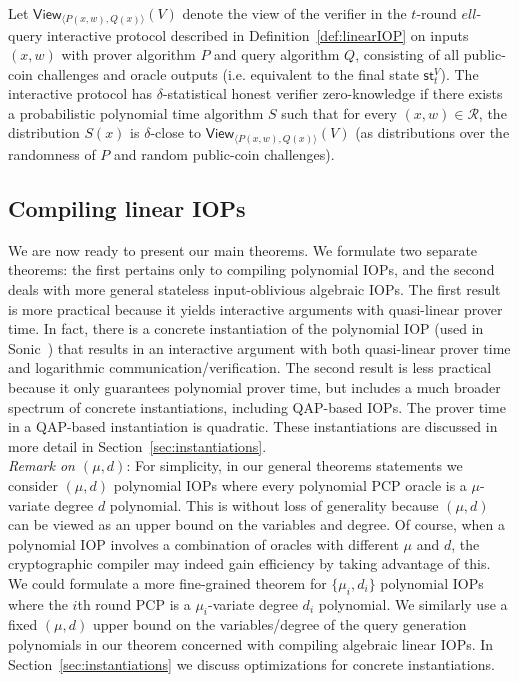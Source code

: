 \begin{definition}
Let $\textsf{View}_{\langle P(x, w), Q(x) \rangle}(V)$ denote the view of the verifier in the $t$-round $ell$-query interactive protocol described in Definition~\ref{def:linearIOP} on inputs $(x,w)$ with prover algorithm $P$ and query algorithm $Q$, consisting of all public-coin challenges and oracle outputs (i.e. equivalent to the final state $\textsf{st}^V_t$). The interactive protocol has $\delta$-statistical honest verifier zero-knowledge if there exists a probabilistic polynomial time algorithm $S$ such that for every $(x, w) \in \mathcal{R}$, the distribution $S(x)$ is $\delta$-close to $\textsf{View}_{\langle P(x, w), Q(x) \rangle}(V)$ (as distributions over the randomness of $P$ and random public-coin challenges).
\end{definition}

\subsection{Compiling linear IOPs} 
We are now ready to present our main theorems. We formulate two separate theorems: the first pertains only to compiling polynomial IOPs, and the second deals with more general stateless input-oblivious algebraic IOPs. The first result is more practical because it yields interactive arguments with quasi-linear prover time. In fact, there is a concrete instantiation of the polynomial IOP (used in Sonic~\cite{Sonic}) that results in an interactive argument with both quasi-linear prover time and logarithmic communication/verification. The second result is less practical because it only guarantees polynomial prover time, but includes a much broader spectrum of concrete instantiations, including QAP-based IOPs. The prover time in a QAP-based instantiation is quadratic. These instantiations are discussed in more detail in Section~\ref{sec:instantiations}. \\

\noindent \emph{Remark on $(\mu, d)$}: For simplicity, in our general theorems statements we consider $(\mu, d)$ polynomial IOPs where every polynomial PCP oracle is a $\mu$-variate degree $d$ polynomial. This is without loss of generality because $(\mu, d)$ can be viewed as an upper bound on the variables and degree. Of course, when a polynomial IOP involves a combination of oracles with different $\mu$ and $d$, the cryptographic compiler may indeed gain efficiency by taking advantage of this. We could formulate a more fine-grained theorem for $\{\mu_i, d_i\}$ polynomial IOPs where the $i$th round PCP is a $\mu_i$-variate degree $d_i$ polynomial. 
We similarly use a fixed $(\mu, d)$ upper bound on the variables/degree of the query generation polynomials in our theorem concerned with compiling algebraic linear 
IOPs. In Section~\ref{sec:instantiations} we discuss optimizations for concrete instantiations. 

